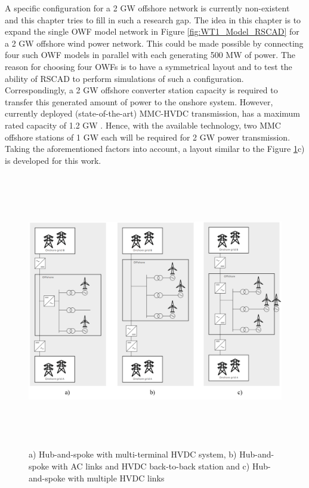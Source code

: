 A specific configuration for a 2 GW offshore network is currently non-existent and this chapter tries to fill in such a research gap. The idea in this chapter is to expand the single \gls{OWF} model network in Figure \ref{fig:WT1_Model_RSCAD} for a 2 GW offshore wind power network. This could be made possible by connecting four such \gls{OWF} models in parallel with each generating 500 MW of power. The reason for choosing four \gls{OWF}s is to have a symmetrical layout and to test the ability of RSCAD to perform simulations of such a configuration. Correspondingly, a 2 GW offshore converter station capacity is required to transfer this generated amount of power to the onshore system. However, currently deployed (state-of-the-art) \gls{MMC}-\gls{HVDC} transmission, has a maximum rated capacity of 1.2 GW \cite{cigre2005b4}. Hence, with the available technology, two \gls{MMC} offshore stations of 1 GW each will be required for 2 GW power transmission. Taking the aforementioned factors into account, a layout similar to the Figure \ref{fig:ABB_Hub_Spoke_3}c) is developed for this work. 

\begin{figure}[H]
\centering
    \includegraphics[height = 12cm,width = \textwidth]{Diagrams/Chapter_4/ABB_Hub_Spoke_3.png}
    \caption{a) Hub-and-spoke with multi-terminal HVDC system, b) Hub-and-spoke with AC links and HVDC back-to-back station and c) Hub-and-spoke with multiple HVDC links \cite{abb_hvdc_2018}}
    \label{fig:ABB_Hub_Spoke_3}
\end{figure}

